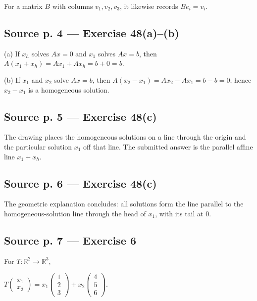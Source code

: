 For a matrix \(B\) with columns \(v_{1},v_{2},v_{3}\), it likewise records \(Be_{i} = v_{i}\).

\subsection{Source p. 4 --- Exercise 48(a)--(b)}

(a) If \(x_{h}\) solves \(Ax = 0\) and \(x_{1}\) solves \(Ax = b\), then \(A\left( {x_{1} + x_{h}} \right) = Ax_{1} + Ax_{h} = b + 0 = b\).

(b) If \(x_{1}\) and \(x_{2}\) solve \(Ax = b\), then \(A\left( {x_{2} - x_{1}} \right) = Ax_{2} - Ax_{1} = b - b = 0\); hence \(x_{2} - x_{1}\) is a homogeneous solution.

\subsection{Source p. 5 --- Exercise 48(c)}

The drawing places the homogeneous solutions on a line through the origin and the particular solution \(x_{1}\) off that line. The submitted answer is the parallel affine line \(x_{1} + x_{h}\).

\subsection{Source p. 6 --- Exercise 48(c)}

The geometric explanation concludes: all solutions form the line parallel to the homogeneous-solution line through the head of \(x_{1}\), with its tail at \(0\).

\subsection{Source p. 7 --- Exercise 6}

For \(T:\mathbb{R}^{2}\rightarrow\mathbb{R}^{3}\),

\(T\begin{pmatrix}
x_{1} \\
x_{2}
\end{pmatrix} = x_{1}\begin{pmatrix}
1 \\
2 \\
3
\end{pmatrix} + x_{2}\begin{pmatrix}
4 \\
5 \\
6
\end{pmatrix}\).

